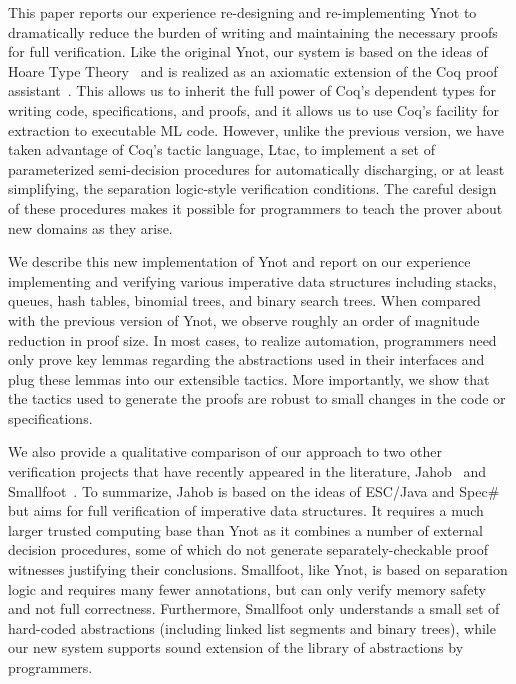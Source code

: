 \documentclass[preprint,nocopyrightspace]{sigplanconf}
\begin{document}
This paper reports our experience re-designing and re-implementing
Ynot to dramatically reduce the burden of writing and maintaining the
necessary proofs for full verification.  Like the original Ynot, our
system is based on the ideas of Hoare Type Theory~\cite{htt} and is
realized as an axiomatic extension of the Coq proof
assistant~\cite{CoqArt}.  This allows us to inherit the full power of
Coq's dependent types for writing code, specifications, and proofs,
and it allows us to use Coq's facility for extraction to executable ML
code.  However, unlike the previous version, we have taken advantage
of Coq's tactic language, Ltac, to implement a set of parameterized
semi-decision procedures for automatically discharging, or at least
simplifying, the separation logic-style verification conditions.  The
careful design of these procedures makes it possible for programmers
to teach the prover about new domains as they arise.

We describe this new implementation of Ynot and report on our
experience implementing and verifying various imperative data
structures including stacks, queues, hash tables, binomial trees, and
binary search trees.  When compared with the previous version of Ynot,
we observe roughly an order of magnitude reduction in proof size.  In
most cases, to realize automation, programmers need only prove key
lemmas regarding the abstractions used in their interfaces and plug
these lemmas into our extensible tactics.  More importantly, we show
that the tactics used to generate the proofs are robust to small
changes in the code or specifications.

We also provide a qualitative comparison of our approach to two other
verification projects that have recently appeared in the literature,
Jahob~\cite{jahob} and Smallfoot~\cite{smallfoot}.  To summarize,
Jahob is based on the ideas of ESC/Java and Spec\# but aims for full
verification of imperative data structures.  It requires a
much larger trusted computing base than Ynot as it combines a number of external
decision procedures, some of which do not generate
separately-checkable proof witnesses justifying their conclusions.
Smallfoot, like Ynot, is based on separation logic and requires many
fewer annotations, but can only verify memory safety and not full
correctness.  Furthermore, Smallfoot only understands a small set of
hard-coded abstractions (including linked list segments and binary trees),
while our new system supports sound extension of the library of
abstractions by programmers.
\end{document}
